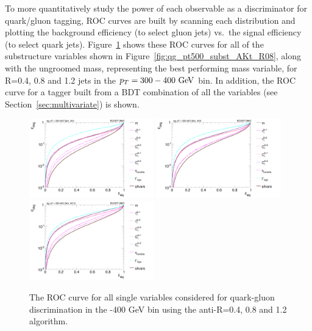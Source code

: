 To more quantitatively study the power of each observable as a
discriminator for quark/gluon tagging, ROC curves are built by scanning each distribution
and plotting the background efficiency (to select gluon jets) vs.~the signal efficiency (to select quark jets). 
Figure~\ref{fig:qg_pt300_single} shows these ROC curves for all of the
substructure variables shown in 
Figure~\ref{fig:qg_pt500_subst_AKt_R08}, along with the ungroomed mass, representing the 
best performing mass variable, for R=0.4, 0.8 and 1.2 jets in the $\pt=300-400\GeV$
bin. In addition, the ROC curve for a tagger built from a BDT
combination of all the variables (see Section~\ref{sec:multivariate}) is shown.
%
\begin{figure}
\centering
\includegraphics[width=0.48\textwidth]{./Figures/QGTagging/pT300/AKtR04/Rocs_1D_single.png}
\includegraphics[width=0.48\textwidth]{./Figures/QGTagging/pT300/AKtR08/Rocs_1D_single.png}
\includegraphics[width=0.48\textwidth]{./Figures/QGTagging/pT300/AKtR12/Rocs_1D_single.png}
\caption{The ROC curve for all single variables considered for
  quark-gluon discrimination in the -400 GeV bin using the
  anti-\kT R=0.4, 0.8 and 1.2 algorithm.%
}
\label{fig:qg_pt300_single}
\end{figure}
